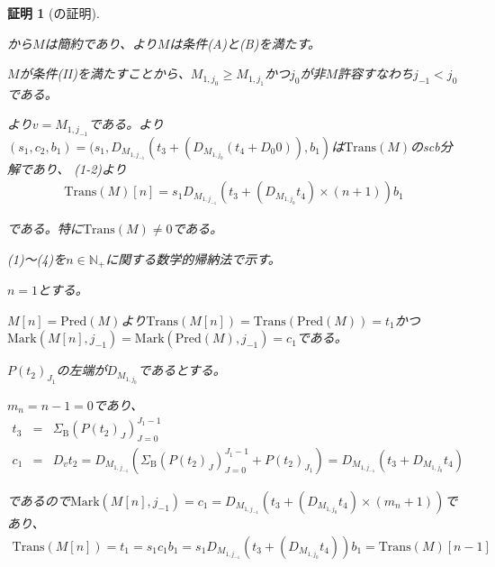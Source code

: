 \documentclass[dvipdfmx,uplatex]{jsarticle}
\theoremstyle{customnonumberbreakfortheorem}
\theoremstyle{customnonumberbreakforproof}
\newtheorem{hideableproof}{証明}
\begin{document}
\begin{hideableproof}[の証明]
	\begin{indented}
		\item {}から\(M\)は簡約であり、より\(M\)は条件(A)と(B)を満たす。
		\item \(M\)が条件(II)を満たすことから、\(M_{1,j_0} \geq M_{1,j_1}\)かつ\(j_0\)が非\(M\)許容すなわち\(j_{-1} < j_0\)である。
		\item {}より\(v = M_{1,j_{-1}}\)である。より\((s_1,c_2,b_1) = (s_1,D_{M_{1,j_{-1}}}(t_3 + (D_{M_{1,j_0}}(t_4 + D_0 0)),b_1)\)は\(\textrm{Trans}(M)\)のscb分解であり、 (1-2)より
		\begin{eqnarray*}
		\textrm{Trans}(M)[n] = s_1 D_{M_{1,j_{-1}}}(t_3 + (D_{M_{1,j_0}} t_4) \times (n+1)) b_1
		\end{eqnarray*}
		\item である。特に\(\textrm{Trans}(M) \neq 0\)である。
		\item
		\item (1)～(4)を\(n \in \mathbb{N}_{+}\)に関する数学的帰納法で示す。
		\item \(n=1\)とする。
		\begin{indented}
			\item \(M[n] = \textrm{Pred}(M)\)より\(\textrm{Trans}(M[n]) = \textrm{Trans}(\textrm{Pred}(M)) = t_1\)かつ\(\textrm{Mark}(M[n],j_{-1}) = \textrm{Mark}(\textrm{Pred}(M),j_{-1}) = c_1\)である。
			\item \(P(t_2)_{J_1}\)の左端が\(D_{M_{1,j_0}}\)であるとする。
			\begin{indented}
				\item \(m_n = n-1 = 0\)であり、
				\begin{eqnarray*}
				t_3 & = & \Sigma_{\textrm{B}} (P(t_2)_J)_{J=0}^{J_1-1} \\
				c_1 & = & D_v t_2 = D_{M_{1,j_{-1}}} (\Sigma_{\textrm{B}} (P(t_2)_J)_{J=0}^{J_1-1} + P(t_2)_{J_1}) = D_{M_{1,j_{-1}}} (t_3 + D_{M_{1,j_0}} t_4)
				\end{eqnarray*}
				\item であるので\(\textrm{Mark}(M[n],j_{-1}) = c_1 = D_{M_{1,j_{-1}}} (t_3 + (D_{M_{1,j_0}} t_4) \times (m_n+1))\)であり、
				\begin{eqnarray*}
				\textrm{Trans}(M[n]) = t_1 = s_1 c_1 b_1 = s_1 D_{M_{1,j_{-1}}} (t_3 + (D_{M_{1,j_0}} t_4)) b_1 = \textrm{Trans}(M)[n-1]
				\end{eqnarray*}

\end{indented}
\end{indented}
\end{indented}
\end{hideableproof}
\end{document}
